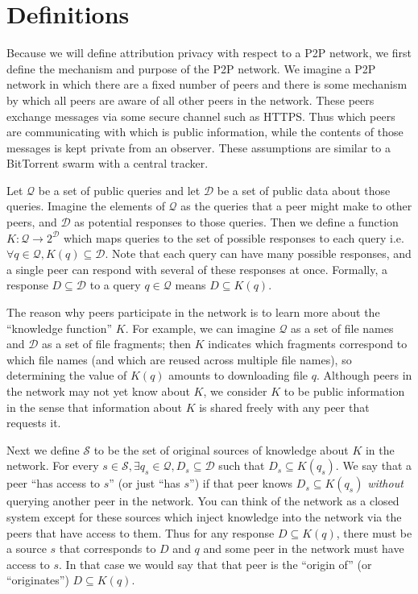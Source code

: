 \documentclass{article}
\begin{document}
\section{Definitions}\label{sec:defn}

Because we will define attribution privacy with respect to a P2P network, we
first define the mechanism and purpose of the P2P network. We imagine a P2P
network in which there are a fixed number of peers and there is some mechanism
by which all peers are aware of all other peers in the network. These peers exchange
messages via some secure channel such as HTTPS. Thus which peers are
communicating with which is public information, while the contents of those
messages is kept private from an observer. These assumptions are similar to a
BitTorrent swarm with a central tracker.

Let $\mathcal{Q}$ be a set of public queries and let $\mathcal{D}$ be a set of
public data about those queries. Imagine the elements of $\mathcal{Q}$ as the
queries that a peer might make to other peers, and $\mathcal{D}$ as
potential responses to those queries. Then we define a function
$K:\mathcal{Q}\rightarrow 2^\mathcal{D}$ which maps queries to the set of
possible responses to each query i.e. $\forall q\in\mathcal{Q},
K(q)\subseteq\mathcal{D}$. Note that each query can have many possible
responses, and a single peer can respond with several of these responses at
once. Formally, a response $D\subseteq\mathcal{D}$ to a query $q\in\mathcal{Q}$
means $D\subseteq K(q)$.

The reason why peers participate in the network is to learn more about the
``knowledge function'' $K$. For example, we can imagine $\mathcal{Q}$ as a set
of file names and $\mathcal{D}$ as a set of file fragments; then $K$ indicates
which fragments correspond to which file names (and which are reused across
multiple file names), so determining the value of $K(q)$ amounts to downloading
file $q$. Although peers in the network may not yet know about $K$, we consider
$K$ to be public information in the sense that information about $K$ is shared
freely with any peer that requests it.

Next we define $\mathcal{S}$ to be the set of original sources of knowledge
about $K$ in the network. For every $s\in\mathcal{S}, \exists
q_s\in\mathcal{Q},D_s\subseteq\mathcal{D}$ such that $D_s\subseteq K(q_s)$. We
say that a peer ``has access to $s$'' (or just ``has $s$'') if that peer knows
$D_s\subseteq K(q_s)$ {\it without} querying another peer in the network. You
can think of the network as a closed system except for these sources which
inject knowledge into the network via the peers that have access to them.
Thus for any response $D\subseteq K(q)$, there must be a source $s$ that
corresponds to $D$ and $q$ and some peer in the network must have access to $s$.
In that case we would say that that peer is the ``origin of'' (or
``originates'') $D\subseteq K(q)$.
\end{document}
